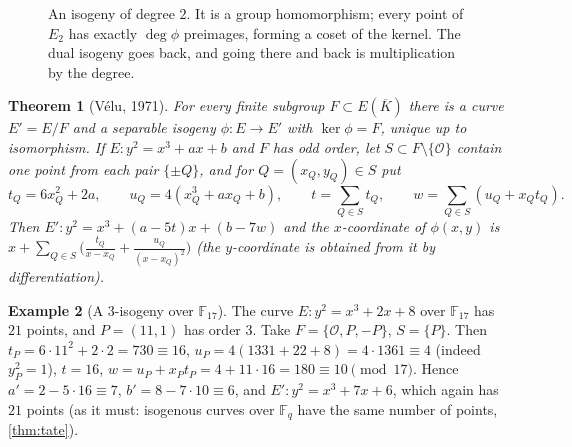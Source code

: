 \documentclass[11pt,a4paper,oneside]{book}
\theoremstyle{plain}
\newtheorem{theorem}{Theorem}[chapter]
\theoremstyle{definition}
\newtheorem{example}[theorem]{Example}
\theoremstyle{remark}
\newcommand{\F}{\mathbb{F}}
\newcommand{\Oinf}{\mathcal{O}}
\newcommand{\Kbar}{\overline{K}}
\begin{document}
\begin{figure}[ht]
\centering
{}
\caption{An isogeny of degree $2$. It is a group homomorphism; every point of $E_2$ has exactly $\deg\phi$ preimages, forming a coset of the kernel. The dual isogeny goes back, and going there and back is multiplication by the degree.}
\end{figure}

\begin{theorem}[V\'elu, 1971]\label{thm:velu}
For every finite subgroup $F\subset E(\Kbar)$ there is a curve $E'=E/F$ and a separable isogeny $\phi:E\to E'$ with $\ker\phi=F$, unique up to isomorphism. If $E:y^2=x^3+ax+b$ and $F$ has odd order, let $S\subset F\setminus\{\Oinf\}$ contain one point from each pair $\{\pm Q\}$, and for $Q=(x_Q,y_Q)\in S$ put
\[
t_Q=6x_Q^2+2a,\qquad u_Q=4(x_Q^3+ax_Q+b),\qquad t=\sum_{Q\in S}t_Q,\qquad w=\sum_{Q\in S}(u_Q+x_Qt_Q).
\]
Then $E':y^2=x^3+(a-5t)x+(b-7w)$ and the $x$-coordinate of $\phi(x,y)$ is $x+\sum_{Q\in S}\Big(\tfrac{t_Q}{x-x_Q}+\tfrac{u_Q}{(x-x_Q)^2}\Big)$ (the $y$-coordinate is obtained from it by differentiation).
\end{theorem}

\begin{example}[A $3$-isogeny over $\F_{17}$]
The curve $E:y^2=x^3+2x+8$ over $\F_{17}$ has $21$ points, and $P=(11,1)$ has order $3$. Take $F=\{\Oinf,P,-P\}$, $S=\{P\}$. Then $t_P=6\cdot11^2+2\cdot2=730\equiv16$, $u_P=4(1331+22+8)=4\cdot1361\equiv4$ (indeed $y_P^2=1$), $t=16$, $w=u_P+x_Pt_P=4+11\cdot16=180\equiv10\pmod{17}$. Hence $a'=2-5\cdot16\equiv7$, $b'=8-7\cdot10\equiv6$, and $E':y^2=x^3+7x+6$, which again has $21$ points (as it must: isogenous curves over $\F_q$ have the same number of points, \cref{thm:tate}).
\end{example}
\end{document}
